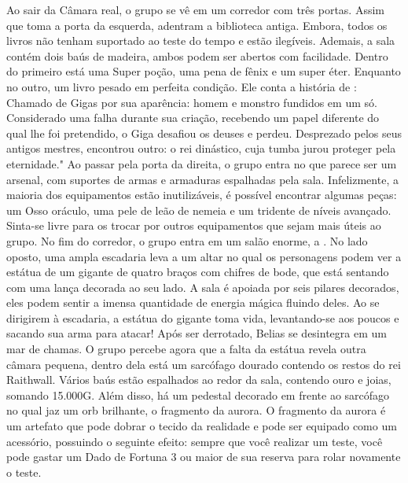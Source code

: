 %
\vfill
%
Ao sair da Câmara real, o grupo se vê em um corredor com três portas.
Assim que toma a porta da esquerda, adentram a biblioteca antiga. Embora, todos os livros não tenham suportado ao teste do tempo e estão ilegíveis. Ademais, a sala contém dois baús de madeira, ambos podem ser abertos com facilidade.
Dentro do primeiro está uma Super poção, uma pena de fênix e um super éter. Enquanto no outro, um livro pesado em perfeita condição. Ele conta a história de : Chamado de Gigas por sua aparência: homem e monstro fundidos em um só. Considerado uma falha durante sua criação, recebendo um papel diferente do qual lhe foi pretendido, o Giga desafiou os deuses e perdeu. Desprezado pelos seus antigos mestres, encontrou outro: o rei dinástico, cuja tumba jurou proteger pela eternidade." 
Ao passar pela porta da direita, o grupo entra no que parece ser um arsenal, com suportes de armas e armaduras espalhadas pela sala.
Infelizmente, a maioria dos equipamentos estão inutilizáveis, é possível encontrar algumas peças: um Osso oráculo, uma pele de leão de nemeia e um tridente de níveis avançado.
Sinta-se livre para os trocar por outros equipamentos que sejam mais úteis ao grupo.
%
\clearpage
%
No fim do corredor, o grupo entra em um salão enorme, a .
No lado oposto, uma ampla escadaria leva a um altar no qual os personagens podem ver a estátua de um gigante de quatro braços com chifres de bode, que está sentando com uma lança decorada ao seu lado.
A sala é apoiada por seis pilares decorados, eles podem sentir a imensa quantidade de energia mágica fluindo deles.
Ao se dirigirem à escadaria, a estátua do gigante toma vida, levantando-se aos poucos e sacando sua arma para atacar!
Após ser derrotado, Belias se desintegra em um mar de chamas. O grupo percebe agora que a falta da estátua revela outra câmara pequena, dentro dela está um sarcófago dourado contendo os restos do rei Raithwall.
Vários baús estão espalhados ao redor da sala, contendo ouro e joias, somando 15.000G.
Além disso, há um pedestal decorado em frente ao sarcófago no qual jaz um orb brilhante, o fragmento da aurora. 
O fragmento da aurora é um artefato que pode dobrar o tecido da realidade e pode ser equipado como um acessório, possuindo o seguinte efeito: sempre que você realizar um teste, você pode gastar um Dado de Fortuna 3 ou maior de sua reserva para rolar novamente o teste.
%
\vfill
%
